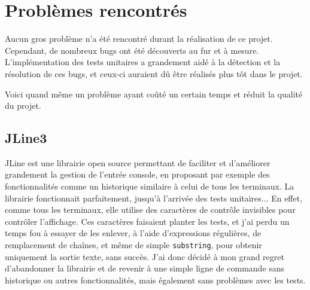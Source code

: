 \documentclass[../report.tex]{subfiles}
\begin{document}
\section{Problèmes rencontrés}
Aucun gros problème n'a été rencontré durant la réalisation de ce projet. Cependant, de nombreux bugs ont été découverts au fur et à mesure. L'implémentation des tests unitaires a grandement aidé à la détection et la résolution de ces bugs, et ceux-ci auraient dû être réalisés plus tôt dans le projet.

Voici quand même un problème ayant coûté un certain temps et réduit la qualité du projet. 
\subsection{JLine3}
JLine est une librairie open source permettant de faciliter et d'améliorer grandement la gestion de l'entrée console, en proposant par exemple des fonctionnalités comme un historique similaire à celui de tous les terminaux. La librairie fonctionnait parfaitement, jusqu'à l'arrivée des tests unitaires... En effet, comme tous les terminaux, elle utilise des caractères de contrôle invisibles pour contrôler l'affichage. Ces caractères faisaient planter les tests, et j'ai perdu un temps fou à essayer de les enlever, à l'aide d'expressions régulières, de remplacement de chaînes, et même de simple \texttt{substring}, pour obtenir uniquement la sortie texte, sans succès. J'ai donc décidé à mon grand regret d'abandonner la librairie et de revenir à une simple ligne de commande sans historique ou autres fonctionnalités, mais également sans problèmes avec les tests.
\end{document}

